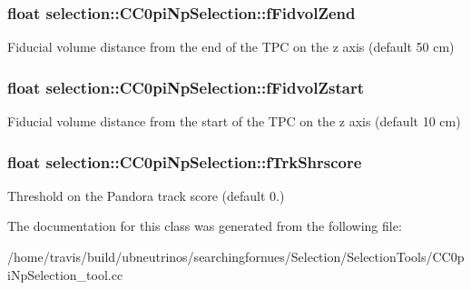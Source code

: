 \subsubsection[{\texorpdfstring{f\+Fidvol\+Zend}{fFidvolZend}}]{\setlength{\rightskip}{0pt plus 5cm}float selection\+::\+C\+C0pi\+Np\+Selection\+::f\+Fidvol\+Zend\hspace{0.3cm}{\ttfamily [private]}}\hypertarget{classselection_1_1CC0piNpSelection_a9ac28bcb4ef95573d416dec35202b18e}{}\label{classselection_1_1CC0piNpSelection_a9ac28bcb4ef95573d416dec35202b18e}
Fiducial volume distance from the end of the T\+PC on the z axis (default 50 cm) 
\subsubsection[{\texorpdfstring{f\+Fidvol\+Zstart}{fFidvolZstart}}]{\setlength{\rightskip}{0pt plus 5cm}float selection\+::\+C\+C0pi\+Np\+Selection\+::f\+Fidvol\+Zstart\hspace{0.3cm}{\ttfamily [private]}}\hypertarget{classselection_1_1CC0piNpSelection_afe5a2b82ecad103b98362839094c47e0}{}\label{classselection_1_1CC0piNpSelection_afe5a2b82ecad103b98362839094c47e0}
Fiducial volume distance from the start of the T\+PC on the z axis (default 10 cm) 
\subsubsection[{\texorpdfstring{f\+Trk\+Shrscore}{fTrkShrscore}}]{\setlength{\rightskip}{0pt plus 5cm}float selection\+::\+C\+C0pi\+Np\+Selection\+::f\+Trk\+Shrscore\hspace{0.3cm}{\ttfamily [private]}}\hypertarget{classselection_1_1CC0piNpSelection_ab72eccf7dab3acafa294a0d8f3e225a0}{}\label{classselection_1_1CC0piNpSelection_ab72eccf7dab3acafa294a0d8f3e225a0}
Threshold on the Pandora track score (default 0.) 

The documentation for this class was generated from the following file\+:\begin{DoxyCompactItemize}
\item 
/home/travis/build/ubneutrinos/searchingfornues/\+Selection/\+Selection\+Tools/C\+C0pi\+Np\+Selection\+\_\+tool.\+cc\end{DoxyCompactItemize}
